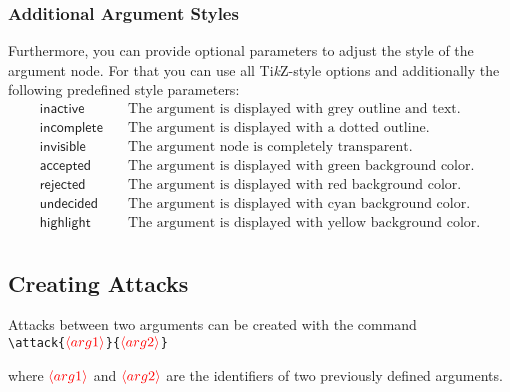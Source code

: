 \documentclass[headings=normal]{scrartcl}
\newcommand{\tikzname}{Ti\emph{k}Z\xspace}
\newcommand{\opt}[2][red]{\ensuremath{\textcolor{#1}{\langle #2\rangle}}}
\begin{document}
\subsubsection{Additional Argument Styles}
    Furthermore, you can provide optional parameters to adjust the style of the argument node.
    For that you can use all \tikzname-style options and additionally the following predefined style parameters:
    \begin{align*}
        \mathsf{inactive} &\quad \text{The argument is displayed with grey outline and text.}\\
        \mathsf{incomplete} &\quad \text{The argument is displayed with a dotted outline.}\\
        \mathsf{invisible} &\quad \text{The argument node is completely transparent.}\\
        \mathsf{accepted} &\quad \text{The argument is displayed with green background color.}\\
        \mathsf{rejected} &\quad \text{The argument is displayed with red background color.}\\
        \mathsf{undecided} &\quad \text{The argument is displayed with cyan background color.}\\
        \mathsf{highlight} &\quad \text{The argument is displayed with yellow background color.}\\
    \end{align*}
    

\subsection{Creating Attacks}
    Attacks between two arguments can be created with the command\\

    \noindent
    \verb|\attack{|\opt{arg1}\verb|}{|\opt{arg2}\verb|}|

    \begin{list}{}{\leftmargin=\parindent\rightmargin=0pt}
        \item where \opt{arg1} and \opt{arg2} are the identifiers of two previously defined arguments.
    \end{list}

    
\end{document}
